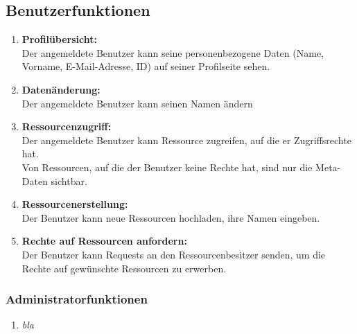\documentclass[parskip=full,11pt]{scrartcl}
\def\threedigits#1{%
  \ifnum#1<10 0\fi
  \ifnum#1<1 0\fi
  \number#1}
\begin{document}
\subsection{Benutzerfunktionen}
\begin{enumerate}[label={\textbf{/F\protect\threedigits{\theenumi}0/}}, leftmargin=*]
\item \textbf{Profilübersicht:} \\ Der angemeldete Benutzer kann seine personenbezogene Daten (Name, Vorname, E-Mail-Adresse, ID) auf seiner Profilseite sehen.
\item \textbf{Datenänderung:} \\ Der angemeldete Benutzer kann seinen Namen ändern
\item \textbf{Ressourcenzugriff:} \\Der angemeldete Benutzer kann Ressource zugreifen, auf die er Zugriffsrechte hat.
\\ Von Ressourcen, auf die der Benutzer keine Rechte hat, sind nur die Meta-Daten sichtbar.

\item \textbf{Ressourcenerstellung:}\\ Der Benutzer kann neue Ressourcen hochladen, ihre Namen eingeben.
\item \textbf{Rechte auf Ressourcen anfordern:}\\ Der Benutzer kann Requests an den Ressourcenbesitzer senden, um die Rechte auf gewünschte Ressourcen zu erwerben.



\end{enumerate}

\subsubsection{Administratorfunktionen}
\begin{enumerate}[label={\textbf{/F\protect\threedigits{\theenumi}0/}}, leftmargin=*, resume]
\item \textit{bla}
\end{enumerate}
\end{document}
